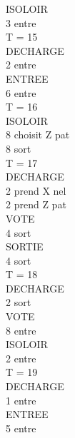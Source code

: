 \documentclass[12pt]{article} %
\begin{document}
\begin{multicols}{3}
{			\hspace*{5mm} ISOLOIR\\
			\hspace*{12mm} 3 entre\\
			T = 15\\
			\hspace*{5mm} DECHARGE\\
			\hspace*{12mm} 2 entre\\
			\hspace*{5mm} ENTREE\\
			\hspace*{12mm} 6 entre\\
			T = 16\\
			\hspace*{5mm} ISOLOIR\\
			\hspace*{12mm} 8 choisit Z pat\\
			\hspace*{12mm} 8 sort\\
			T = 17\\
			\hspace*{5mm} DECHARGE\\
			\hspace*{12mm} 2 prend X nel\\
			\hspace*{12mm} 2 prend Z pat\\
			\hspace*{5mm} VOTE\\
			\hspace*{12mm} 4 sort\\
			\hspace*{5mm} SORTIE\\
			\hspace*{12mm} 4 sort\\
			T = 18\\
			\hspace*{5mm} DECHARGE\\
			\hspace*{12mm} 2 sort\\
			\hspace*{5mm} VOTE\\
			\hspace*{12mm} 8 entre\\
			\hspace*{5mm} ISOLOIR\\
			\hspace*{12mm} 2 entre\\
			T = 19\\
			\hspace*{5mm} DECHARGE\\
			\hspace*{12mm} 1 entre\\
			\hspace*{5mm} ENTREE\\
			\hspace*{12mm} 5 entre\\
			
}
\end{multicols}
\end{document}

